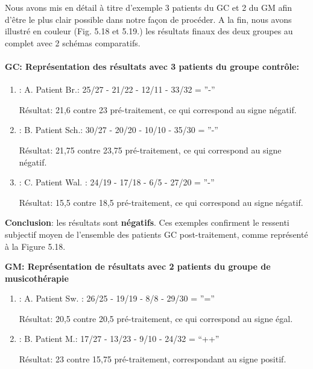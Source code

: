 Nous avons mis en détail  à titre d'exemple 3 patients du GC et 2 du GM
afin d'être le plus clair possible
dans notre façon de procéder.
A la fin, nous avons illustré en couleur (Fig. 5.18 et 5.19.) les
résultats finaux des deux groupes au complet avec 2 schémas
comparatifs.

\paragraph{ GC: Représentation des résultats avec 3 patients du groupe contrôle:}

\begin{enumerate}
\item : A. Patient Br.:  25/27 - 21/22 - 12/11 - 33/32 =  ''-''
  
          Résultat: 21,6 contre 23 pré-traitement,  ce qui
        correspond au signe négatif.
      \item : B. Patient Sch.: 30/27 - 20/20 -  10/10 - 35/30 = ''-''
        
         Résultat: 21,75 contre 23,75 pré-traitement, ce qui
        correspond au signe négatif.
              
 		\item :  C. Patient Wal. : 24/19 -  17/18 - 6/5 -
                  27/20 =  ''-''

                  Résultat: 15,5 contre 18,5 pré-traitement, ce qui
        correspond au signe négatif.
 	\end{enumerate}
        

       \textbf{ Conclusion}: les résultats sont \textbf{négatifs}.
        Ces exemples confirment  
        le ressenti subjectif moyen de l'ensemble des patients
        GC post-traitement, comme représenté à la Figure 5.18.

       \textbf{ GM: Représentation de résultats avec 2 patients du groupe de musicothérapie}

\begin{enumerate}
 		\item : A. Patient Sw. : 26/25 - 19/19 - 8/8 - 29/30 =  ''='' 
                
                
                
  Résultat: 20,5 contre 20,5 pré-traitement, ce qui
        correspond au signe égal.



 		\item : B. Patient M.: 17/27 - 13/23 -  9/10 - 24/32 = ``++''
 	
              Résultat: 23 contre 15,75 pré-traitement, correspondant
              au signe positif. 
            \end{enumerate}
            
